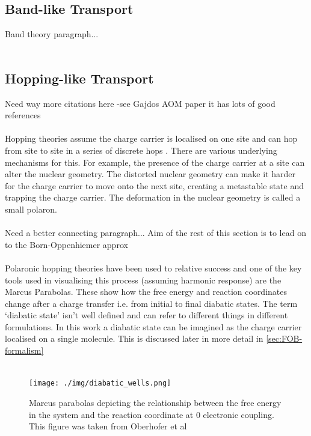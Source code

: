 \subsection{Band-like Transport}
{\LARGE Band theory paragraph...}
\\\\
\subsection{Hopping-like Transport}
{\Large Need way more citations here -see Gajdos AOM paper it has lots of good references}
\\\\
Hopping theories assume the charge carrier is localised on one site and can hop from site to site in a series of discrete hops \cite{oberhofer_charge_2017}. There are various underlying mechanisms for this. For example, the presence of the charge carrier at a site can alter the nuclear geometry. The distorted nuclear geometry can make it harder for the charge carrier to move onto the next site, creating a metastable state and trapping the charge carrier. The deformation in the nuclear geometry is called a small polaron.
\\\\
{\LARGE Need a better connecting paragraph... Aim of the rest of this section is to lead on to the Born-Oppenhiemer approx}
\\\\
Polaronic hopping theories have been used to relative success and one of the key tools used in visualising this process (assuming harmonic response) are the Marcus Parabolas. These show how the free energy and reaction coordinates change after a charge transfer i.e. from initial to final diabatic states. The term `diabatic state' isn't well defined and can refer to different things in different formulations. In this work a diabatic state can be imagined as the charge carrier localised on a single molecule. This is discussed later in more detail in  \ref{sec:FOB-formalism}\\
\\
\begin{figure}[ht]
  \texttt{[image: ./img/diabatic\_wells.png]}
  \caption{Marcus parabolas depicting the relationship between the free energy in the system and the reaction coordinate at 0 electronic coupling. This figure was taken from Oberhofer et al \cite{oberhofer_charge_2017}}
  \label{fig:diab_wells}
\end{figure}
\\
